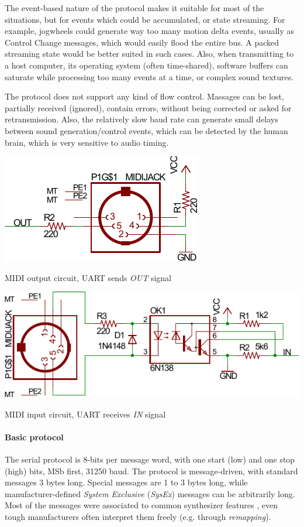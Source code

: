 \documentclass[a4paper,10pt]{article}
\makeatletter
\newenvironment{figurehere}{\def\@captype{figure}\vspace{2ex}}{\vspace{2ex}}
\makeatother
\begin{document}
\begin{multicols}{2}
The event-based nature of the protocol makes it suitable for most of the
situations, but for events which could be accumulated, or state streaming.
For example, jogwheels could generate way too many motion delta events, usually
as Control Change messages, which would easily flood the entire bus. A packed
streaming state would be better suited in such cases.
Also, when transmitting to a host computer, its operating system (often
time-shared), software buffers can saturate while processing too many events
at a time, or complex sound textures.

The protocol does not support any kind of flow control. Massages can be lost,
partially received (ignored), contain errors, without being corrected or asked
for retransmission. Also, the relatively slow baud rate can generate small
delays between sound generation/control events, which can be detected by
the human brain, which is very sensitive to audio timing.

\begin{figurehere}
	\centering
	\includegraphics[keepaspectratio=true,width=0.6\columnwidth]{images/midi_out.pdf}
	\caption{MIDI output circuit, UART sends \emph{OUT} signal}
	\label{fig:midi_out}
\end{figurehere}

\begin{figurehere}
	\centering
	\includegraphics[keepaspectratio=true,width=\columnwidth]{images/midi_in.pdf}
	\caption{MIDI input circuit, UART receives \emph{IN} signal}
	\label{fig:midi_in}
\end{figurehere}


\paragraph{Basic protocol}
The serial protocol is 8-bits per message word, with one start (low) and one
stop (high) bits, MSb first, 31250 baud. The protocol is message-driven, with
standard messages 3 bytes long. Special messages are 1 to 3 bytes long, while
manufacturer-defined \emph{System Exclusive} (\emph{SysEx}) messages can be
arbitrarily long. Most of the messages were associated to common synthesizer
features \cite{midi_messages}, even tough manufacturers often interpret them
freely (e.g. through \emph{remapping}).


\end{multicols}
\end{document}
